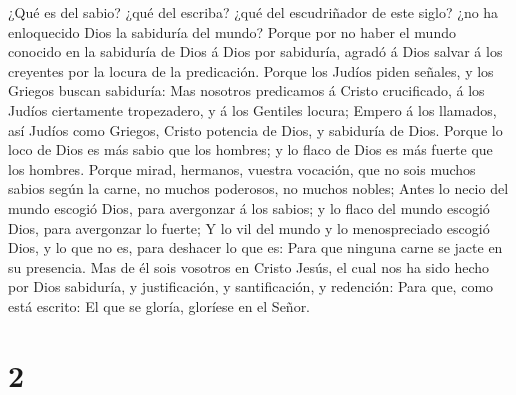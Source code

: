  ¿Qué es del sabio? ¿qué del escriba? ¿qué del
escudriñador de este siglo? ¿no ha enloquecido Dios la sabiduría del
mundo?  Porque por no haber el mundo conocido en la
sabiduría de Dios á Dios por sabiduría, agradó á Dios salvar á los
creyentes por la locura de la predicación.  Porque los
Judíos piden señales, y los Griegos buscan sabiduría: 
Mas nosotros predicamos á Cristo crucificado, á los Judíos ciertamente
tropezadero, y á los Gentiles locura;  Empero á los
llamados, así Judíos como Griegos, Cristo potencia de Dios, y sabiduría
de Dios.  Porque lo loco de Dios es más sabio que los
hombres; y lo flaco de Dios es más fuerte que los hombres.
 Porque mirad, hermanos, vuestra vocación, que no sois
muchos sabios según la carne, no muchos poderosos, no muchos nobles;
 Antes lo necio del mundo escogió Dios, para avergonzar á
los sabios; y lo flaco del mundo escogió Dios, para avergonzar lo
fuerte;  Y lo vil del mundo y lo menospreciado escogió
Dios, y lo que no es, para deshacer lo que es:  Para que
ninguna carne se jacte en su presencia.  Mas de él sois
vosotros en Cristo Jesús, el cual nos ha sido hecho por Dios sabiduría,
y justificación, y santificación, y redención:  Para que,
como está escrito: El que se gloría, gloríese en el Señor.

\hypertarget{section-1}{%
\section{2}\label{section-1}}

